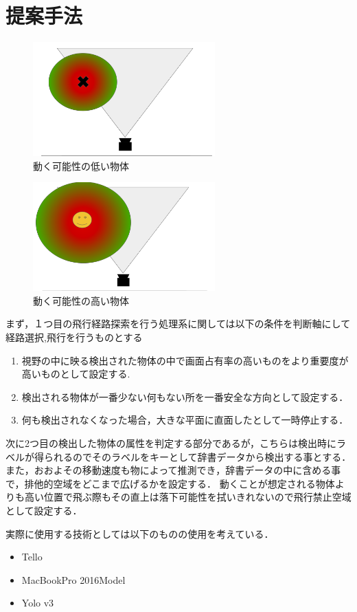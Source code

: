 \section{提案手法}


\begin{figure}[htbp]
  \includegraphics[width=7cm]{img/figure1.png}
  \caption{動く可能性の低い物体}
\end{figure}
\begin{figure}[htbp]
  \includegraphics[width=7cm]{img/figure2.png}
  \caption{動く可能性の高い物体}
\end{figure}

まず，１つ目の飛行経路探索を行う処理系に関しては以下の条件を判断軸にして経路選択,飛行を行うものとする

\begin{enumerate}
\item 視野の中に映る検出された物体の中で画面占有率の高いものをより重要度が高いものとして設定する.
\item 検出される物体が一番少ない何もない所を一番安全な方向として設定する．
\item 何も検出されなくなった場合，大きな平面に直面したとして一時停止する．
\end{enumerate}

次に2つ目の検出した物体の属性を判定する部分であるが，こちらは検出時にラベルが得られるのでそのラベルをキーとして辞書データから検出する事とする．
また，おおよその移動速度も物によって推測でき，辞書データの中に含める事で，排他的空域をどこまで広げるかを設定する．
動くことが想定される物体よりも高い位置で飛ぶ際もその直上は落下可能性を拭いきれないので飛行禁止空域として設定する．

実際に使用する技術としては以下のものの使用を考えている．
\begin{itemize}
\item Tello
\item MacBookPro 2016Model
\item Yolo v3
\end{itemize}
